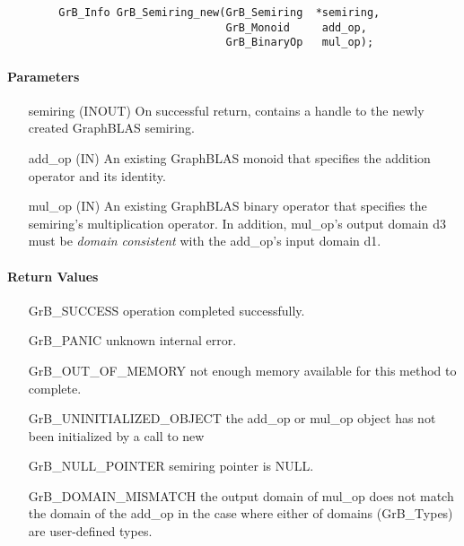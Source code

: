 \begin{verbatim}
        GrB_Info GrB_Semiring_new(GrB_Semiring  *semiring,
                                  GrB_Monoid     add_op,
                                  GrB_BinaryOp   mul_op);
\end{verbatim}

\paragraph{Parameters}

\begin{itemize}[leftmargin=1.1in]
    \item[{\sf semiring}] ({\sf INOUT}) On successful return, contains a 
    handle to the newly created GraphBLAS semiring.
    \item[{\sf add\_op}]  ({\sf IN}) An existing GraphBLAS monoid that specifies 
    the addition operator and its identity.
    \item[{\sf mul\_op}]  ({\sf IN}) An existing GraphBLAS binary operator that 
    specifies the semiring's multiplication operator. In addition, {\sf mul\_op}'s output domain {\sf d3} must be \emph{domain consistent} with the {\sf add\_op}'s input domain {\sf d1}.
\end{itemize}


\paragraph{Return Values}

\begin{itemize}[leftmargin=2.1in]
\item[{\sf GrB\_SUCCESS}]           operation completed successfully.
\item[{\sf GrB\_PANIC}]             unknown internal error.
\item[{\sf GrB\_OUT\_OF\_MEMORY}]          not enough memory available for this method to complete.
\item[{\sf GrB\_UNINITIALIZED\_OBJECT}]          the {\sf add\_op} or {\sf mul\_op} object has
                                    not been initialized by a call to {\sf new}
\item[{\sf GrB\_NULL\_POINTER}]    {\sf semiring} pointer is {\sf NULL}.
\item[{\sf GrB\_DOMAIN\_MISMATCH}]  the output domain of {\sf mul\_op} does not
                                    match the domain of the {\sf add\_op} in the
                                    case where either of domains ({\sf GrB\_Type}s)
                                    are user-defined types.
\end{itemize}

